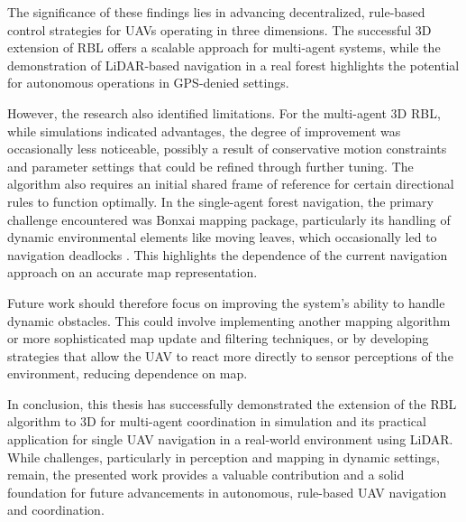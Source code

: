 The significance of these findings lies in advancing decentralized, rule-based control strategies for \ac{UAV}s operating in three dimensions. 
The successful 3D extension of \ac{RBL} offers a scalable approach for multi-agent systems, while the demonstration of \ac{LiDAR}-based navigation in a real forest highlights the potential for autonomous operations in GPS-denied settings. 

However, the research also identified limitations. 
For the multi-agent 3D \ac{RBL}, while simulations indicated advantages, the degree of improvement was occasionally less noticeable, possibly a result of conservative motion constraints and parameter settings that could be refined through further tuning.
The algorithm also requires an initial shared frame of reference for certain directional rules to function optimally. 
In the single-agent forest navigation, the primary challenge encountered was Bonxai mapping package, particularly its handling of dynamic environmental elements like moving leaves, which occasionally led to navigation deadlocks \cite{flight_fail}. 
This highlights the dependence of the current navigation approach on an accurate map representation.

Future work should therefore focus on improving the system's ability to handle dynamic obstacles. 
This could involve implementing another mapping algorithm or more sophisticated map update and filtering techniques, or by developing strategies that allow the UAV to react more directly to sensor perceptions of the environment, reducing dependence on map.

In conclusion, this thesis has successfully demonstrated the extension of the \ac{RBL} algorithm to 3D for multi-agent coordination in simulation and its practical application for single \ac{UAV} navigation in a real-world environment using \ac{LiDAR}. 
While challenges, particularly in perception and mapping in dynamic settings, remain, the presented work provides a valuable contribution and a solid foundation for future advancements in autonomous, rule-based \ac{UAV} navigation and coordination.
